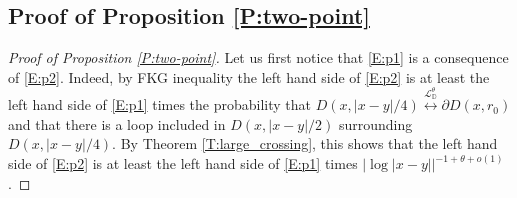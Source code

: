 \documentclass[11pt]{article}
\theoremstyle{remark}
\newcommand{\D}{\mathbb{D}}
\newcommand{\Lc}{\mathcal{L}}
\numberwithin{equation}{section}
\begin{document}
\subsection{Proof of Proposition \ref{P:two-point}}\label{SS:p}

\begin{proof}[Proof of Proposition \ref{P:two-point}]
Let us first notice that \eqref{E:p1} is a consequence of \eqref{E:p2}. Indeed, by FKG inequality the left hand side of \eqref{E:p2} is at least the left hand side of \eqref{E:p1} times the probability that $D(x,|x-y|/4) \overset{\Lc_\D^\theta}{\longleftrightarrow} \partial D(x,r_0)$ and that there is a loop included in $D(x,|x-y|/2)$ surrounding $D(x,|x-y|/4)$. By Theorem \ref{T:large_crossing}, this shows that the left hand side of \eqref{E:p2} is at least the left hand side of \eqref{E:p1} times $|\log |x-y||^{-1+\theta+o(1)}$.


\end{proof}
\end{document}
